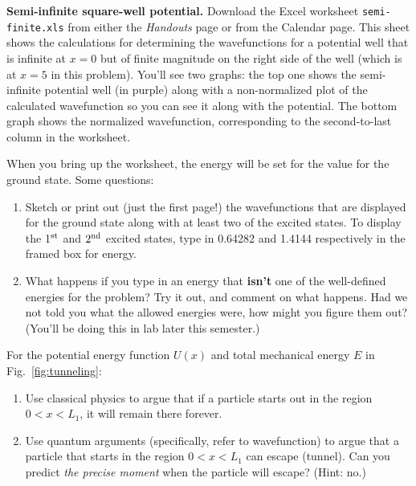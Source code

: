 \begin{problem}
 {\bf Semi-infinite square-well potential.} Download the Excel worksheet
\verb+semi-finite.xls+ from either the {\it Handouts} page or from the
Calendar page.  This sheet shows the calculations for determining the
wavefunctions for a potential well that is infinite at $x=0$ but of 
finite magnitude on the right side of the well (which is at $x=5$ in
this problem).  You'll see two
graphs: the top one shows the semi-infinite potential well (in
purple) along with a non-normalized plot of the calculated
wavefunction so you can see it along with the potential.  The bottom
graph shows the normalized wavefunction, corresponding to the
second-to-last column in the worksheet.  

When you bring up the worksheet, the energy will be set for the
value for the ground state.  Some questions:

\begin{enumerate}

\item Sketch or print out (just the first page!) the wavefunctions 
that are displayed for the ground state along with at least two 
of the excited states.  To display
the 1$^{\rm st}$ and $2^{\rm nd}$ excited states, type in 0.64282 and 
1.4144 respectively in the framed box for energy.  

\item What happens if you type in an energy that {\bf isn't} one
of the well-defined energies for the problem?  Try it out, and
comment on what happens.  Had we not told you what the allowed
energies were, how might you figure them out?  (You'll be doing
this in lab later this semester.)

\end{enumerate}
\end{problem}

\newpage


\begin{problem}
For the potential energy function $U(x)$ and total mechanical energy $E$
in Fig.~\ref{fig:tunneling}:
\begin{enumerate}
\item Use classical physics to argue that if a particle starts out
in the region $0 < x < L_1$, it will remain there forever.

\item Use quantum arguments (specifically, refer to wavefunction) to
argue that a particle that starts in the region $0 < x < L_1$ can escape
(tunnel). Can you predict {\it the precise moment} when the particle will 
escape? (Hint: no.)
\end{enumerate}
\end{problem}

